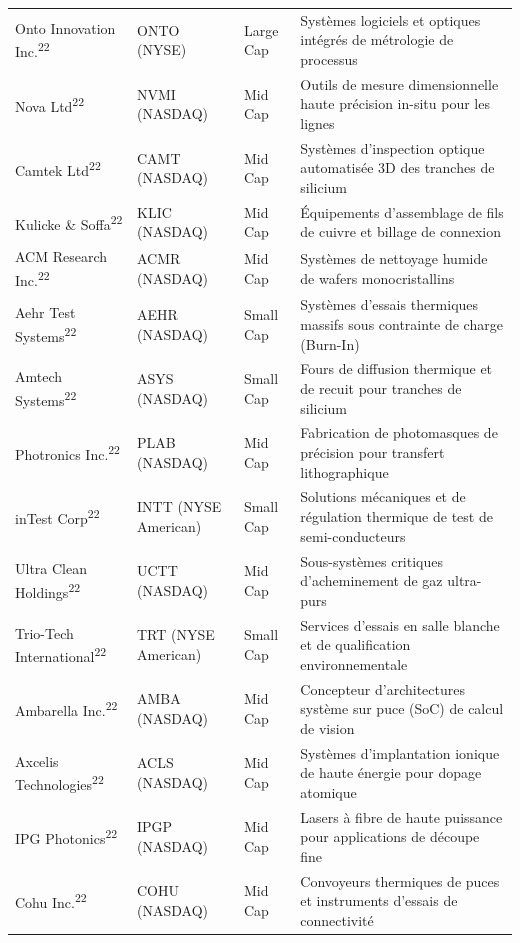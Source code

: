 \documentclass[11pt,a4paper]{article}
\begin{document}
\begin{longtable}{p{3cm} p{3.5cm} p{3cm} p{5cm}}
Onto Innovation Inc.\textsuperscript{22} & ONTO (NYSE) & Large Cap & Systèmes logiciels et optiques intégrés de métrologie de processus \\
Nova Ltd\textsuperscript{22} & NVMI (NASDAQ) & Mid Cap & Outils de mesure dimensionnelle haute précision in-situ pour les lignes \\
Camtek Ltd\textsuperscript{22} & CAMT (NASDAQ) & Mid Cap & Systèmes d'inspection optique automatisée 3D des tranches de silicium \\
Kulicke \& Soffa\textsuperscript{22} & KLIC (NASDAQ) & Mid Cap & Équipements d'assemblage de fils de cuivre et billage de connexion \\
ACM Research Inc.\textsuperscript{22} & ACMR (NASDAQ) & Mid Cap & Systèmes de nettoyage humide de wafers monocristallins \\
Aehr Test Systems\textsuperscript{22} & AEHR (NASDAQ) & Small Cap & Systèmes d'essais thermiques massifs sous contrainte de charge (Burn-In) \\
Amtech Systems\textsuperscript{22} & ASYS (NASDAQ) & Small Cap & Fours de diffusion thermique et de recuit pour tranches de silicium \\
Photronics Inc.\textsuperscript{22} & PLAB (NASDAQ) & Mid Cap & Fabrication de photomasques de précision pour transfert lithographique \\
inTest Corp\textsuperscript{22} & INTT (NYSE American) & Small Cap & Solutions mécaniques et de régulation thermique de test de semi-conducteurs \\
Ultra Clean Holdings\textsuperscript{22} & UCTT (NASDAQ) & Mid Cap & Sous-systèmes critiques d'acheminement de gaz ultra-purs \\
Trio-Tech International\textsuperscript{22} & TRT (NYSE American) & Small Cap & Services d'essais en salle blanche et de qualification environnementale \\
Ambarella Inc.\textsuperscript{22} & AMBA (NASDAQ) & Mid Cap & Concepteur d'architectures système sur puce (SoC) de calcul de vision \\
Axcelis Technologies\textsuperscript{22} & ACLS (NASDAQ) & Mid Cap & Systèmes d'implantation ionique de haute énergie pour dopage atomique \\
IPG Photonics\textsuperscript{22} & IPGP (NASDAQ) & Mid Cap & Lasers à fibre de haute puissance pour applications de découpe fine \\
Cohu Inc.\textsuperscript{22} & COHU (NASDAQ) & Mid Cap & Convoyeurs thermiques de puces et instruments d'essais de connectivité \\

\end{longtable}
\end{document}
